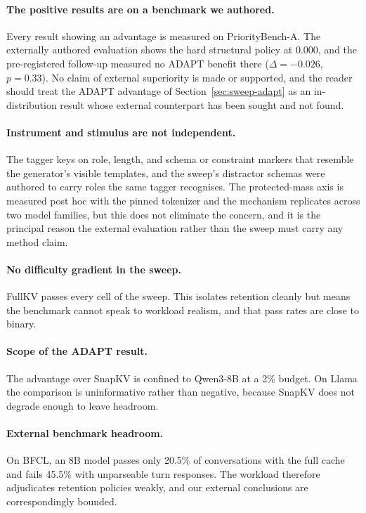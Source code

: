 \paragraph{The positive results are on a benchmark we authored.}
Every result showing an advantage is measured on PriorityBench-A.  The
externally authored evaluation shows the hard structural policy at 0.000, and
the pre-registered follow-up measured no ADAPT benefit there
($\Delta=-0.026$, $p=0.33$).  No claim of external superiority is made or
supported, and the reader should treat the ADAPT advantage of
Section~\ref{sec:sweep-adapt} as an in-distribution result whose external
counterpart has been sought and not found.

\paragraph{Instrument and stimulus are not independent.}
The tagger keys on role, length, and schema or constraint markers that resemble
the generator's visible templates, and the sweep's distractor schemas were
authored to carry roles the same tagger recognises.  The protected-mass axis is
measured post hoc with the pinned tokenizer and the mechanism replicates across
two model families, but this does not eliminate the concern, and it is the
principal reason the external evaluation rather than the sweep must carry any
method claim.

\paragraph{No difficulty gradient in the sweep.}
FullKV passes every cell of the sweep.  This isolates retention cleanly but
means the benchmark cannot speak to workload realism, and that pass rates are
close to binary.

\paragraph{Scope of the ADAPT result.}
The advantage over SnapKV is confined to Qwen3-8B at a 2\% budget.  On Llama the
comparison is uninformative rather than negative, because SnapKV does not
degrade enough to leave headroom.

\paragraph{External benchmark headroom.}
On BFCL, an 8B model passes only 20.5\% of conversations with the full cache and
fails 45.5\% with unparseable turn responses.  The workload therefore adjudicates
retention policies weakly, and our external conclusions are correspondingly
bounded.

